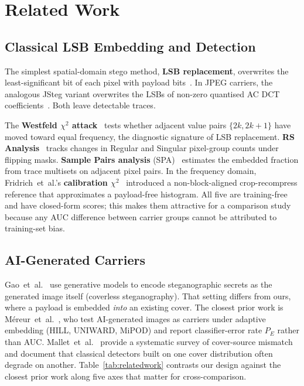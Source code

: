 \documentclass[10pt,twocolumn,a4paper]{article}
\begin{document}
\section{Related Work}
\label{sec:relatedwork}

\subsection{Classical LSB Embedding and Detection}
The simplest spatial-domain stego method, \textbf{LSB replacement}, overwrites the least-significant bit of each pixel with payload bits~\cite{petitcolas1999,hussain2018}. In JPEG carriers, the analogous JSteg variant overwrites the LSBs of non-zero quantised AC DCT coefficients~\cite{westfeld1999chi,fridrich2003calib}. Both leave detectable traces.

The \textbf{Westfeld $\chi^2$ attack}~\cite{westfeld1999chi} tests whether adjacent value pairs $\{2k,2k\!+\!1\}$ have moved toward equal frequency, the diagnostic signature of LSB replacement. \textbf{RS Analysis}~\cite{fridrich2001lsb} tracks changes in Regular and Singular pixel-group counts under flipping masks. \textbf{Sample Pairs analysis} (SPA)~\cite{dumitrescu2003sp} estimates the embedded fraction from trace multisets on adjacent pixel pairs. In the frequency domain, Fridrich~et~al.'s \textbf{calibration $\chi^2$}~\cite{fridrich2003calib} introduced a non-block-aligned crop-recompress reference that approximates a payload-free histogram. All five are training-free and have closed-form scores; this makes them attractive for a comparison study because any AUC difference between carrier groups cannot be attributed to training-set bias.

\subsection{AI-Generated Carriers}
Gao~et~al.~\cite{gao2022ai} use generative models to encode steganographic secrets as the generated image itself (coverless steganography). That setting differs from ours, where a payload is embedded \emph{into} an existing cover. The closest prior work is M\'{e}reur~et~al.~\cite{mereur2024deepfake}, who test AI-generated images as carriers under adaptive embedding (HILL, UNIWARD, MiPOD) and report classifier-error rate $P_E$ rather than AUC. Mallet~et~al.~\cite{mallet2024csm} provide a systematic survey of cover-source mismatch and document that classical detectors built on one cover distribution often degrade on another. Table~\ref{tab:relatedwork} contrasts our design against the closest prior work along five axes that matter for cross-comparison.
\end{document}
